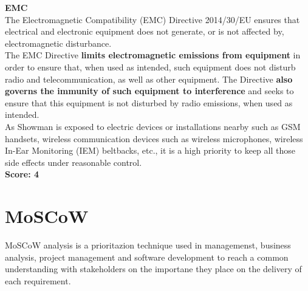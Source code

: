 \textbf{EMC} \\
The Electromagnetic Compatibility (EMC) Directive 2014/30/EU ensures that electrical and electronic equipment does not generate, or is not affected by, electromagnetic disturbance. \\
The EMC Directive \textbf{limits electromagnetic emissions from equipment} in order to ensure that, when used as intended, such equipment does not disturb radio and telecommunication, as well as other equipment. The Directive \textbf{also governs the immunity of such equipment to interference} and seeks to ensure that this equipment is not disturbed by radio emissions, when used as intended. \\
As Showman is exposed to electric devices or installations nearby such as GSM handsets, wireless communication devices such as wireless microphones, wireless In-Ear Monitoring (IEM) beltbacks, etc., it is a high priority to keep all those side effects under reasonable control. \\
\textbf{Score: 4} \newline





\section{MoSCoW}
MoSCoW analysis is a prioritazion technique used in managemenst, business analysis, project management and software development to reach a common understanding with stakeholders on the importane they place on the delivery of each requirement. \\

